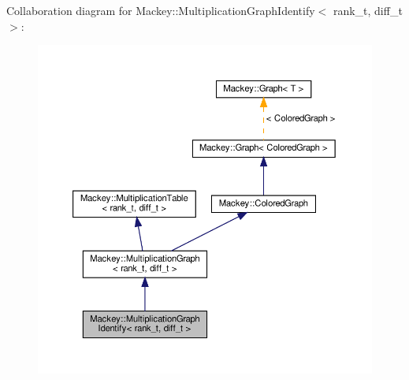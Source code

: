 Collaboration diagram for Mackey\+:\+:Multiplication\+Graph\+Identify$<$ rank\+\_\+t, diff\+\_\+t $>$\+:\nopagebreak
\begin{figure}[H]
\begin{center}
\leavevmode
\includegraphics[width=350pt]{classMackey_1_1MultiplicationGraphIdentify__coll__graph}
\end{center}
\end{figure}

